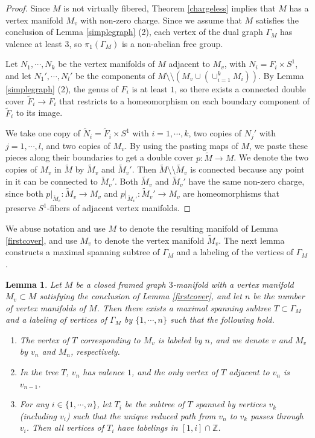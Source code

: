 \documentclass{amsart}
\numberwithin{equation}{section}
\newtheorem{lemma}[theorem]{Lemma}
\theoremstyle{definition}
\begin{document}
\begin{proof}
Since $M$ is not virtually fibered, Theorem \ref{chargeless} implies that $M$ has a vertex manifold $M_v$ with non-zero charge. Since we assume that $M$ satisfies the conclusion of Lemma \ref{simplegraph} (2), each vertex of the dual graph $\Gamma_M$ has valence at least $3$, so $\pi_1(\Gamma_M)$ is a non-abelian free group.

Let $N_1,\cdots, N_k$ be the vertex manifolds of $M$ adjacent to $M_v$, with $N_i=F_i\times S^1$, and let $N_1',\cdots, N_l'$ be the components of $M\setminus \setminus (M_v\cup (\cup_{i=1}^kM_i))$. By Lemma \ref{simplegraph} (2), the genus of $F_i$ is at least $1$, so there exists a connected double cover $\tilde{F}_i\to F_i$ that restricts to a homeomorphism on each boundary component of $\tilde{F}_i$ to its image.

We take one copy of $\tilde{N}_i=\tilde{F}_i\times S^1$ with $i=1,\cdots,k$, two copies of $N_j'$ with $j=1,\cdots,l$, and two copies of $M_v$. By using the pasting maps of $M$, we paste these pieces along their boundaries to get a double cover $p:\tilde{M}\to M$. We denote the two copies of $M_v$ in $\tilde{M}$ by $\tilde{M}_v$ and $\tilde{M}_v'$. Then $\tilde{M}\setminus\setminus \tilde{M}_v$ is connected because any point in it can be connected to $\tilde{M}_v'$. Both $\tilde{M}_v$ and $\tilde{M}_v'$ have the same non-zero charge, since both $p|_{\tilde{M}_v}:\tilde{M}_v\to M_v$ and $p|_{\tilde{M}_v'}:\tilde{M}_v'\to M_v$ are homeomorphisms that preserve $S^1$-fibers of adjacent vertex manifolds.
\end{proof}

We abuse notation and use $M$ to denote the resulting manifold of Lemma \ref{firstcover}, and use $M_v$ to denote the vertex manifold $\tilde{M}_v$. The next lemma constructs a maximal spanning subtree of $\Gamma_M$ and a labeling of the vertices of $\Gamma_M$.

\begin{lemma}\label{tree}
Let $M$ be a closed framed graph $3$-manifold with a vertex manifold $M_v\subset M$ satisfying the conclusion of Lemma \ref{firstcover}, and let $n$ be the number of vertex manifolds of $M$. Then there exists a maximal spanning subtree $T\subset \Gamma_M$ and a labeling of vertices of $\Gamma_M$ by $\{1,\cdots,n\}$ such that the following hold.
\begin{enumerate}
\item The vertex of $T$ corresponding to $M_v$ is labeled by $n$, and we denote $v$ and $M_v$ by $v_n$ and $M_n$, respectively.
\item In the tree $T$, $v_n$ has valence $1$, and the only vertex of $T$ adjacent to $v_n$ is $v_{n-1}$.
\item For any $i\in \{1,\cdots,n\}$, let $T_i$ be the subtree of $T$ spanned by vertices $v_k$ (including $v_i$) such that the unique reduced path from $v_n$ to $v_k$ passes through $v_i$. Then all vertices of $T_i$ have labelings in $[1,i]\cap \mathbb{Z}$.
\end{enumerate}
\end{lemma}
\end{document}
